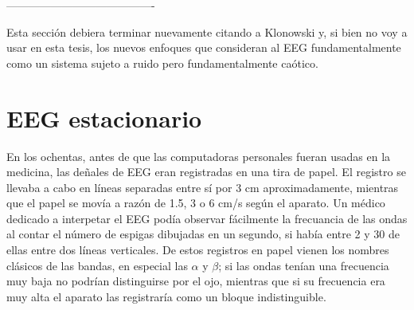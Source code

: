 ----------------------------------------

Esta secci\'on debiera terminar nuevamente citando a Klonowski y, 
si bien no voy a usar en esta tesis, los
nuevos enfoques que consideran al EEG fundamentalmente como un sistema sujeto a ruido pero
fundamentalmente ca\'otico.


\section{EEG estacionario}

En los ochentas, antes de que las computadoras personales fueran usadas en la medicina, las
de\~nales de EEG eran registradas en una tira de papel. El registro se llevaba a cabo
en l\'ineas separadas entre s\'i por 3 cm aproximadamente, mientras que el papel se mov\'ia a 
raz\'on de 1.5, 3 o 6 cm/s seg\'un el aparato. Un m\'edico dedicado a interpetar el EEG pod\'ia
observar f\'acilmente la frecuancia de las ondas al contar el n\'umero de espigas dibujadas
en un segundo, si hab\'ia entre 2 y 30 de ellas entre dos l\'ineas verticales. De estos registros
en papel vienen los nombres cl\'asicos de las bandas, en especial las $\alpha$ y $\beta$; si las
ondas ten\'ian una frecuencia muy baja no podr\'ian distinguirse por el ojo, 
mientras que si su frecuencia era muy alta el aparato las registrar\'ia como un bloque 
indistinguible\cite{Klonowski09}.


